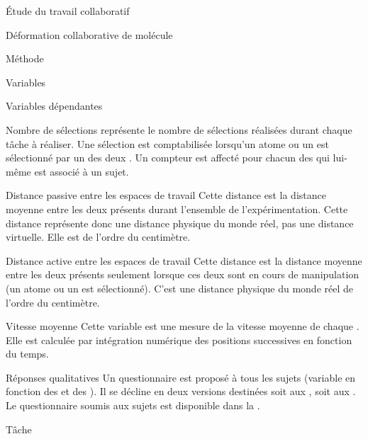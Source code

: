 \documentclass[myfrancais]{mythesis}
\begin{document}
\begin{mypart}{Étude du travail collaboratif}
\begin{mychapter}{Déformation collaborative de molécule}
\begin{mysection}{Méthode}
\begin{mysubsection}{Variables}
\begin{mysubsubsection}{Variables dépendantes}
\begin{myparagraph}{ Nombre de sélections}
							 représente le nombre de sélections réalisées durant chaque tâche à réaliser.
							Une sélection est comptabilisée lorsqu'un atome ou un  est sélectionné par un des deux .
							Un compteur est affecté pour chacun des  qui lui-même est associé à un sujet.
						\end{myparagraph}
						\begin{myparagraph}{ Distance passive entre les espaces de travail}
							Cette distance est la distance moyenne entre les deux  présents durant l'ensemble de l'expérimentation.
							Cette distance représente donc une distance physique du monde réel, pas une distance virtuelle.
							Elle est de l'ordre du centimètre.
						\end{myparagraph}
						\begin{myparagraph}{ Distance active entre les espaces de travail}
							Cette distance est la distance moyenne entre les deux  présents seulement lorsque ces deux  sont en cours de manipulation (un atome ou un  est sélectionné).
							C'est une distance physique du monde réel de l'ordre du centimètre.
						\end{myparagraph}
						\begin{myparagraph}{ Vitesse moyenne}
							Cette variable est une mesure de la vitesse moyenne de chaque .
							Elle est calculée par intégration numérique des positions successives en fonction du temps.
						\end{myparagraph}
						\begin{myparagraph}{ Réponses qualitatives}
							Un questionnaire est proposé à tous les sujets (variable en fonction des  et des ).
							Il se décline en deux versions destinées soit aux , soit aux .
							Le questionnaire soumis aux sujets est disponible dans la .
						\end{myparagraph}
					\end{mysubsubsection}
				\end{mysubsection}
				\begin{mysubsection}{Tâche}

\end{mysubsection}
\end{mysection}
\end{mychapter}
\end{mypart}
\end{document}
